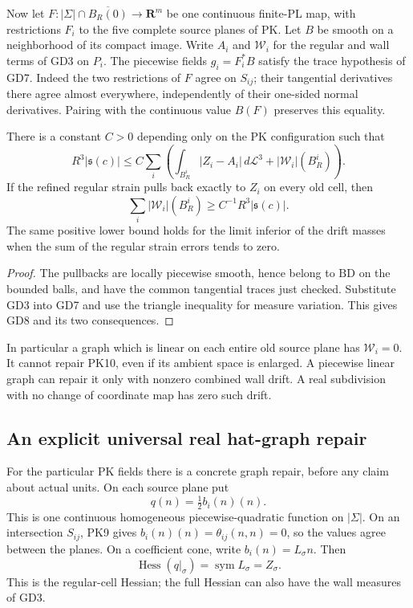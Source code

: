 Now let \(F:|\Sigma|\cap\overline{B_R(0)}\to\mathbf R^m\)
be one continuous finite-PL map, with restrictions \(F_i\)
to the five complete source planes of PK.  Let \(B\) be
smooth on a neighborhood of its compact image.  Write \(A_i\) and
\(\mathcal W_i\) for the regular and wall terms of GD3
on \(P_i\).  The piecewise fields \(g_i=F_i^*B\) satisfy
the trace hypothesis of GD7.  Indeed the two restrictions
of \(F\) agree on \(S_{ij}\); their tangential derivatives
there agree almost everywhere, independently of their
one-sided normal derivatives.  Pairing with the continuous
value \(B(F)\) preserves this equality.

\begin{corollary}
\label{cor:r13-graph-repair-drift-lower-bound}
There is a constant \(C>0\) depending only on the PK
configuration such that
\[
 R^3|\mathfrak s(c)|\leq C\sum_i
       \left(\int_{B_R^i}|Z_i-A_i|\,d\mathcal L^3
                          +|\mathcal W_i|(B_R^i)\right).
 \tag{GD8}
\]
If the refined regular strain pulls back exactly to \(Z_i\)
on every old cell, then
\[
        \sum_i|\mathcal W_i|(B_R^i)
                   \geq C^{-1}R^3|\mathfrak s(c)|.
 \tag{GD9}
\]
The same positive lower bound holds for the limit inferior
of the drift masses when the sum of the regular strain
errors tends to zero.
\end{corollary}

\begin{proof}
The pullbacks are locally piecewise smooth, hence belong
to \(\mathrm{BD}\) on the bounded balls, and have the
common tangential traces just checked.  Substitute GD3
into GD7 and use the triangle inequality for measure
variation.  This gives GD8 and its two consequences.
\end{proof}

In particular a graph which is linear on each entire old
source plane has \(\mathcal W_i=0\).  It cannot repair
PK10, even if its ambient space is enlarged.  A piecewise
linear graph can repair it only with nonzero combined
wall drift.  A real subdivision with no change of
coordinate map has zero such drift.

\subsection{An explicit universal real hat-graph repair}

For the particular PK fields there is a concrete graph
repair, before any claim about actual units.  On each
source plane put
\[
                         q(n)=\tfrac12 b_i(n)(n).
 \tag{GD10}
\]
This is one continuous homogeneous piecewise-quadratic
function on \(|\Sigma|\).  On an intersection \(S_{ij}\),
PK9 gives \(b_i(n)(n)=\theta_{ij}(n,n)=0\), so the
values agree between the planes.  On a coefficient cone,
write \(b_i(n)=L_\sigma n\).  Then
\[
                  \operatorname{Hess}(q|_\sigma)
                         =\operatorname{sym}L_\sigma=Z_\sigma.
 \tag{GD11}
\]
This is the regular-cell Hessian; the full Hessian can
also have the wall measures of GD3.

